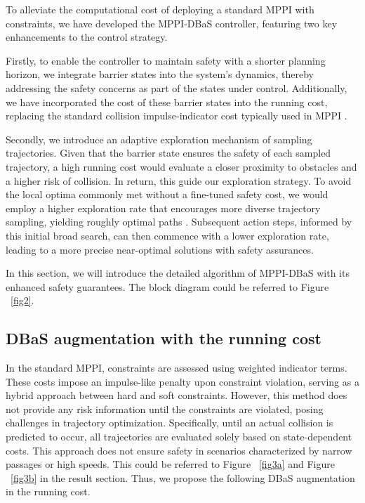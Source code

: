 \documentclass[english]{cccconf}
\begin{document}
To alleviate the computational cost of deploying a standard MPPI with constraints, we have developed the MPPI-DBaS controller, featuring two key enhancements to the control strategy.

Firstly, to enable the controller to maintain safety with a shorter planning horizon, we integrate barrier states into the system's dynamics, thereby addressing the safety concerns as part of the states under control. Additionally, we have incorporated the cost of these barrier states into the running cost, replacing the standard collision impulse-indicator cost typically used in MPPI \cite{yin2023shield}.

Secondly, we introduce an adaptive exploration mechanism of sampling trajectories. Given that the barrier state ensures the safety of each sampled trajectory, a high running cost would evaluate a closer proximity to obstacles and a higher risk of collision. In return, this guide our exploration strategy. To avoid the local optima commonly met without a fine-tuned safety cost, we would employ a higher exploration rate that encourages more diverse trajectory sampling, yielding roughly optimal paths \cite{yin2022trajectory}. Subsequent action steps, informed by this initial broad search, can then commence with a lower exploration rate, leading to a more precise near-optimal solutions with safety assurances.

In this section, we will introduce the detailed algorithm of MPPI-DBaS with its enhanced safety guarantees. The block diagram could be referred to Figure ~\ref{fig2}.


\subsection{DBaS augmentation with the running cost}
In the standard MPPI, constraints are assessed using weighted indicator terms. These costs impose an impulse-like penalty upon constraint violation, serving as a hybrid approach between hard and soft constraints. However, this method does not provide any risk information until the constraints are violated, posing challenges in trajectory optimization. Specifically, until an actual collision is predicted to occur, all trajectories are evaluated solely based on state-dependent costs. This approach does not ensure safety in scenarios characterized by narrow passages or high speeds. This could be referred to Figure ~\ref{fig3a} and Figure ~\ref{fig3b} in the result section. Thus, we propose the following DBaS augmentation in the running cost.
\end{document}
